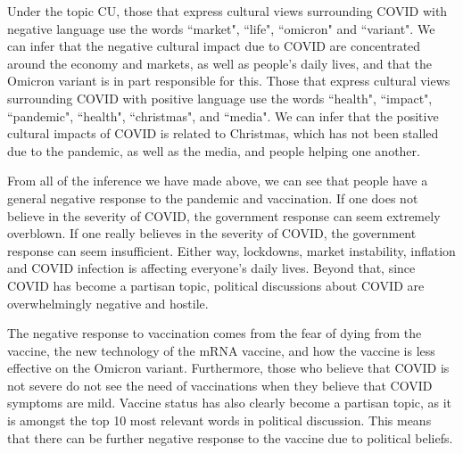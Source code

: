 \documentclass[letterpaper]{article} %
\begin{document}
Under the topic CU, those that express cultural views surrounding COVID with negative language use the words ``market", ``life", ``omicron" and ``variant". We can infer that the negative cultural impact due to COVID are concentrated around the economy and markets, as well as people's daily lives, and that the Omicron variant is in part responsible for this. Those that express cultural views surrounding COVID with positive language use the words ``health", ``impact", ``pandemic", ``health", ``christmas", and ``media". We can infer that the positive cultural impacts of COVID is related to Christmas, which has not been stalled due to the pandemic, as well as the media, and people helping one another. \par
From all of the inference we have made above, we can see that people have a general negative response to the pandemic and vaccination. If one does not believe in the severity of COVID, the government response can seem extremely overblown. If one really believes in the severity of COVID, the government response can seem insufficient. Either way, lockdowns, market instability, inflation and COVID infection is affecting everyone's daily lives. Beyond that, since COVID has become a partisan topic, political discussions about COVID are overwhelmingly negative and hostile. \par
The negative response to vaccination comes from the fear of dying from the vaccine, the new technology of the mRNA vaccine, and how the vaccine is less effective on the Omicron variant. Furthermore, those who believe that COVID is not severe do not see the need of vaccinations when they believe that COVID symptoms are mild. Vaccine status has also clearly become a partisan topic, as it is amongst the top 10 most relevant words in political discussion. This means that there can be further negative response to the vaccine due to political beliefs. 
\end{document}
